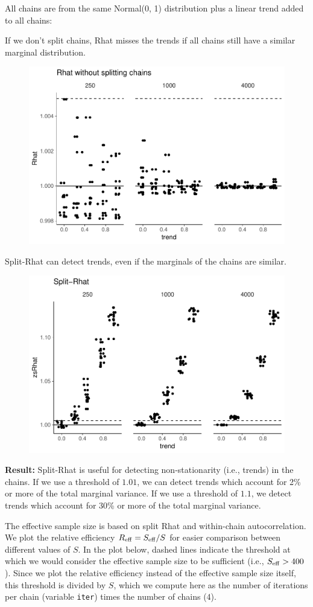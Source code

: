 \documentclass[american,]{article}
\begin{document}
All chains are from the same Normal(0, 1) distribution plus a linear
trend added to all chains:

If we don't split chains, Rhat misses the trends if all chains still
have a similar marginal distribution.

\begin{figure}[t]
  \centering
  \includegraphics[width=0.6\linewidth]{graphics/rhat-same-trend-1.pdf}
\end{figure}

Split-Rhat can detect trends, even if the marginals of the chains are
similar.

\begin{figure}[t]
  \centering
  \includegraphics[width=0.6\linewidth]{graphics/zsrhat-same-trend-1.pdf}
\end{figure}

\textbf{Result:} Split-Rhat is useful for detecting non-stationarity
(i.e., trends) in the chains. If we use a threshold of \(1.01\), we can
detect trends which account for 2\% or more of the total marginal
variance. If we use a threshold of \(1.1\), we detect trends which
account for 30\% or more of the total marginal variance.

The effective sample size is based on split Rhat and within-chain
autocorrelation. We plot the relative efficiency
\(R_{\rm eff}=S_{\rm eff}/S\) for easier comparison between different
values of \(S\). In the plot below, dashed lines indicate the threshold
at which we would consider the effective sample size to be sufficient
(i.e., \(S_{\rm eff} > 400\)). Since we plot the relative efficiency
instead of the effective sample size itself, this threshold is divided
by \(S\), which we compute here as the number of iterations per chain
(variable \texttt{iter}) times the number of chains (\(4\)).
\end{document}
